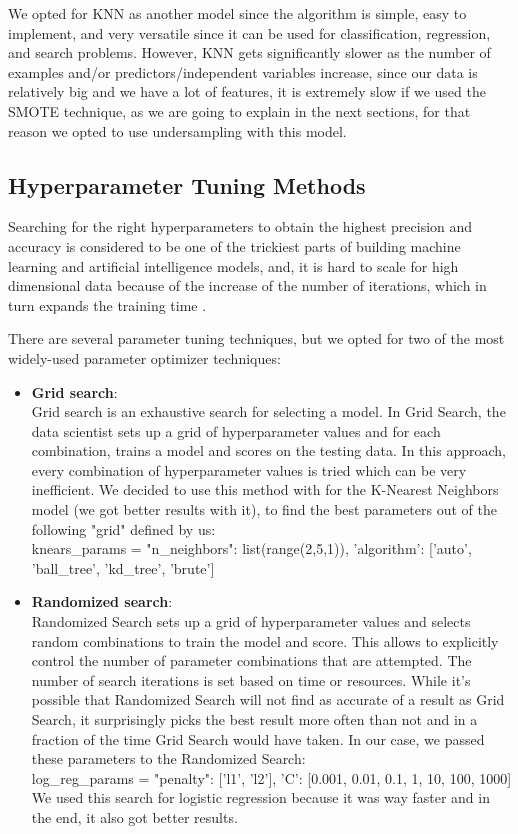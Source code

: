 \documentclass[conference]{IEEEtran}
\begin{document}
We opted for KNN as another model since the algorithm is simple, easy to implement, and very versatile since it can be used for classification, regression, and search problems. However, KNN gets significantly slower as the number of examples and/or predictors/independent variables increase, since our data is relatively big and we have a lot of features, it is extremely slow if we used the SMOTE technique, as we are going to explain in the next sections, for that reason we opted to use undersampling with this model.

\subsection{Hyperparameter Tuning Methods}

Searching for the right hyperparameters to obtain the highest precision and accuracy is considered to be one of the trickiest parts of building machine learning and artificial intelligence models, and, it is hard to scale for high dimensional data because of the increase of the number of iterations, which in turn expands the training time \cite{hyper_parameters}.

There are several parameter tuning techniques, but we opted for two of the most widely-used parameter optimizer techniques:

\begin{itemize}
\item \textbf{Grid search}: \\
Grid search is an exhaustive search for selecting a model. In Grid Search, the data scientist sets up a grid of hyperparameter values and for each combination, trains a model and scores on the testing data. In this approach, every combination of hyperparameter values is tried which can be very inefficient.
We decided to use this method with for the K-Nearest Neighbors model (we got better results with it), to find the best parameters out of the following "grid" defined by us: \\
knears\_params = {"n\_neighbors": list(range(2,5,1)), 'algorithm': ['auto', 'ball\_tree', 'kd\_tree', 'brute']}

\item \textbf{Randomized search}: \\
Randomized Search sets up a grid of hyperparameter values and selects random combinations to train the model and score. This allows to explicitly control the number of parameter combinations that are attempted. The number of search iterations is set based on time or resources. While it’s possible that Randomized Search will not find as accurate of a result as Grid Search, it surprisingly picks the best result more often than not and in a fraction of the time Grid Search would have taken. In our case, we passed these parameters to the Randomized Search: \\
log\_reg\_params = {"penalty": ['l1', 'l2'], 'C': [0.001, 0.01, 0.1, 1, 10, 100, 1000]} \\
We used this search for logistic regression because it was way faster and in the end, it also got better results.
\end{itemize}
\end{document}
